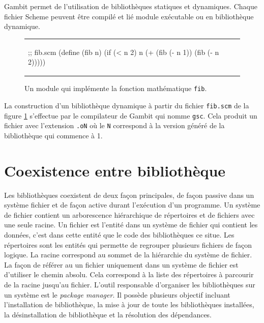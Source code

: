 Gambit permet de l'utilisation de bibliothèques statiques et dynamiques.
Chaque fichier Scheme peuvent être compilé et lié module exécutable ou
en bibliothèque dynamique.

\begin{center}
\begin{figure}[ht]
  \begin{tabular}{l}
    \begin{mplisting}{0.5}
;; fib.scm
(define (fib n)
  (if (< n 2)
      n
      (+ (fib (- n 1))
         (fib (- n 2)))))
\end{mplisting}
  \end{tabular}
  \caption{Un module qui implémente la fonction mathématique \texttt{fib}.}
  \label{fig:basic_fib_module}
\end{figure}
\end{center}

\vspace{-20pt}
La construction d'un bibliothèque dynamique à partir du fichier \texttt{fib.scm}
de la figure \ref{fig:basic_fib_module} s'effectue par le compilateur de Gambit
qui nomme \texttt{gsc}. Cela produit un fichier avec l'extension \texttt{.oN}
où le \texttt{N} correspond à la version généré de la bibliothèque qui commence à 1.


\section{Coexistence entre bibliothèque}
Les bibliothèques coexistent de deux façon principales, de façon passive dans
un système fichier et de façon active durant l'exécution d'un programme.  Un
système de fichier contient un arborescence hiérarchique de répertoires et de
fichiers avec une seule racine. Un fichier est l'entité dans un système de
fichier qui contient les données, c'est dans cette entité que le code des
bibliothèques ce situe.  Les répertoires sont les entités qui permette de
regrouper plusieurs fichiers de façon logique. La racine correspond au sommet
de la hiérarchie du système de fichier. La façon de référer au un fichier
uniquement dans un système de fichier est d'utiliser le chemin absolu. Cela
correspond à la liste des répertoires à parcourir de la racine jusqu'au
fichier. L'outil responsable d'organiser les bibliothèques sur un système
est le \textit{package manager}. Il possède plusieurs objectif incluant
l'installation de bibliothèque, la mise à jour de toute les bibliothèques
installées, la désinstallation de bibliothèque et la résolution des dépendances.

